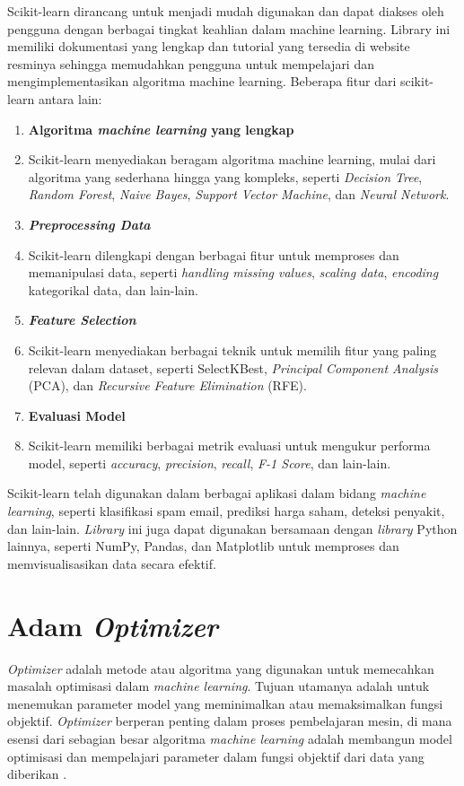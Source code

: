 Scikit-learn dirancang untuk menjadi mudah digunakan dan dapat diakses oleh pengguna dengan berbagai tingkat keahlian dalam machine learning. Library ini memiliki dokumentasi yang lengkap dan tutorial yang tersedia di website resminya sehingga memudahkan pengguna untuk mempelajari dan mengimplementasikan algoritma machine learning. Beberapa fitur dari scikit-learn antara lain:
\begin{enumerate}
    \item \textbf{Algoritma \textit{machine learning} yang lengkap}
    \item[] Scikit-learn menyediakan beragam algoritma machine learning, mulai dari algoritma yang sederhana hingga yang kompleks, seperti \textit{Decision Tree}, \textit{Random Forest}, \textit{Naive Bayes}, \textit{Support Vector Machine}, dan \textit{Neural Network}.
    \item \textbf{\textit{Preprocessing Data}}
    \item [] Scikit-learn dilengkapi dengan berbagai fitur untuk memproses dan memanipulasi data, seperti \textit{handling missing values}, \textit{scaling data}, \textit{encoding} kategorikal data, dan lain-lain.
    \item \textbf{\textit{Feature Selection}}
    \item[] Scikit-learn menyediakan berbagai teknik untuk memilih fitur yang paling relevan dalam dataset, seperti SelectKBest, \textit{Principal Component Analysis} (PCA), dan \textit{Recursive Feature Elimination} (RFE).
    \item \textbf{Evaluasi Model}
    \item[] Scikit-learn memiliki berbagai metrik evaluasi untuk mengukur performa model, seperti \textit{accuracy}, \textit{precision}, \textit{recall}, \textit{F-1 Score}, dan lain-lain. 
\end{enumerate}

Scikit-learn telah digunakan dalam berbagai aplikasi dalam bidang \textit{machine learning}, seperti klasifikasi spam email, prediksi harga saham, deteksi penyakit, dan lain-lain. \textit{Library} ini juga dapat digunakan bersamaan dengan \textit{library} Python lainnya, seperti NumPy, Pandas, dan Matplotlib untuk memproses dan memvisualisasikan data secara efektif.

\section{Adam \textit{Optimizer}}
\textit{Optimizer} adalah metode atau algoritma yang digunakan untuk memecahkan masalah optimisasi dalam \textit{machine learning}. Tujuan utamanya adalah untuk menemukan parameter model yang meminimalkan atau memaksimalkan fungsi objektif. \textit{Optimizer} berperan penting dalam proses pembelajaran mesin, di mana esensi dari sebagian besar algoritma \textit{machine learning} adalah membangun model optimisasi dan mempelajari parameter dalam fungsi objektif dari data yang diberikan \cite{sun2019}.

